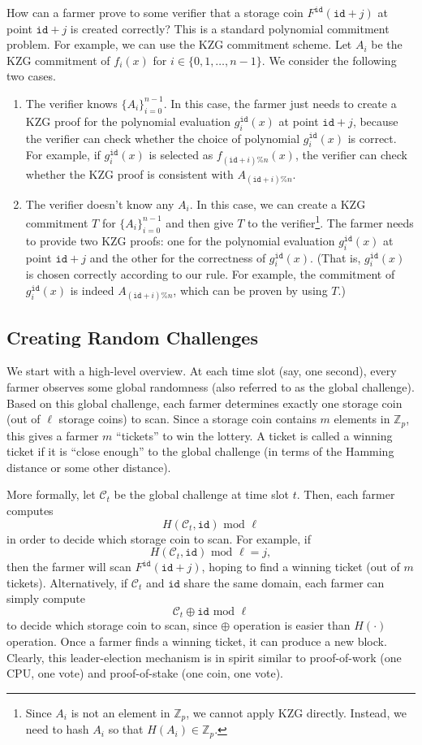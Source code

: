 \documentclass[conference]{IEEEtran}
\newcommand{\Fp}{\mathbb{Z}_p}
\newcommand{\id}{\texttt{id}}
\begin{document}
How can a farmer prove to some verifier that a storage coin $F^{\id}(\id + j)$ at point $\id + j$ is created correctly? This is a standard polynomial commitment problem. For example, we can use the
KZG commitment scheme. Let $A_i$ be the KZG commitment of $f_i(x)$ for $i \in \{0, 1, \ldots, n-1\}$. 
We consider the following two cases.
\begin{enumerate}
    \item The verifier knows $\{ A_i \}_{i = 0}^{n - 1}$. In this case, the farmer just needs to create a KZG proof for the polynomial evaluation $g_i^{\id}(x)$ at point $\id + j$, because the verifier can check whether the choice of polynomial $g_i^{\id}(x)$ is correct. For example, if $g_i^{\id}(x)$ is selected as $f_{(\id + i)\% n}(x)$, the verifier can check whether the KZG proof is consistent with $A_{(\id + i)\% n}$. 
    \item The verifier doesn't know any $A_i$. In this case, we can create a KZG commitment $T$ for $\{ A_i \}_{i = 0}^{n - 1}$ and then give $T$ to the verifier\footnote{Since $A_i$ is not an element in $\Fp$, we cannot apply KZG directly. Instead, we need to hash $A_i$ so that $H(A_i) \in \Fp$.}.  The farmer needs to provide two KZG proofs: one for the polynomial evaluation $g_i^{\id}(x)$ at point $\id + j$ and the other for the correctness of $g_i^{\id}(x)$. (That is, $g_i^{\id}(x)$ is chosen correctly according to our rule. For example, the commitment of $g_i^{\id}(x)$ is indeed $A_{(\id + i)\% n}$, which can be proven by using $T$.)
\end{enumerate}

\subsection{Creating Random Challenges}

We start with a high-level overview. At each time slot (say, one second), every farmer observes some global randomness (also referred to as the global challenge). 
Based on this global challenge, each farmer determines exactly one storage coin (out of $\ell$ storage coins) to scan. Since a storage coin contains $m$ elements in $\Fp$, this gives a farmer $m$ ``tickets'' to win the lottery. A ticket is called a winning ticket if it is ``close enough'' to the global challenge (in terms of the Hamming distance or some other distance).

More formally, let $\mathcal{C}_t$ be the global challenge at time slot $t$. Then, each farmer computes
\[
H(\mathcal{C}_t, \id) \mbox{ mod } \ell
\]
in order to decide which storage coin to scan.
For example, if 
\[
H(\mathcal{C}_t, \id) \mbox{ mod } \ell = j,
\]
then the farmer will scan $F^{\id}(\id + j)$, hoping to find a winning ticket (out of $m$ tickets). 
Alternatively, if $\mathcal{C}_t$ and $\id$ share the same domain, each farmer can simply compute
\[
\mathcal{C}_t \oplus \id \mbox{ mod } \ell
\]
to decide which storage coin to scan, since $\oplus$ operation is easier than $H(\cdot)$ operation. 
Once a farmer finds a winning ticket, it can produce a new block.
Clearly, this leader-election mechanism is in spirit similar to proof-of-work (one CPU, one vote) and proof-of-stake (one coin, one vote).
\end{document}
